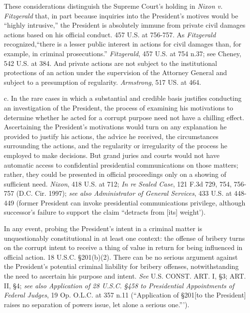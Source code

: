 These considerations distinguish the Supreme Court’s holding in \textit{Nixon v. Fitzgerald} that, in part because inquiries into the President’s motives would be “highly intrusive,” the President is absolutely immune from private civil damages actions based on his official conduct. 457 U.S. at 756-757.
As \textit{Fitzgerald} recognized,“there is a lesser public interest in actions for civil damages than, for example, in criminal prosecutions.”
\textit{Fitzgerald}, 457 U.S. at 754 n.37; see Cheney, 542 U.S. at 384.
And private actions are not subject to the institutional protections of an action under the supervision of the Attorney General and subject to a presumption of regularity.
\textit{Armstrong}, 517 US. at 464.

c. In the rare cases in which a substantial and credible basis justifies conducting an investigation of the President, the process of examining his motivations to determine whether he acted for a corrupt purpose need not have a chilling effect.
Ascertaining the President’s motivations would turn on any explanation he provided to justify his actions, the advice he received, the circumstances surrounding the actions, and the regularity or irregularity of the process he employed to make decisions.
But grand juries and courts would not have automatic access to confidential presidential communications on those matters; rather, they could be presented in official proceedings only on a showing of sufficient need.
\textit{Nixon}, 418 U.S. at 712;
\textit{In re Sealed Case}, 121 F.3d 729, 754, 756-757 (D.C. Cir. 1997);
\textit{see also Administrator of General Services}, 433 U.S. at 448-449 (former President can invoke presidential communications privilege, although successor’s failure to support the claim “detracts from [its] weight’).

In any event, probing the President’s intent in a criminal matter is unquestionably constitutional in at least one context: the offense of bribery turns on the corrupt intent to receive a thing of value in return for being influenced in official action.
18 U.S.C. \S 201(b)(2).
There can be no serious argument against the President’s potential criminal liability for bribery offenses, notwithstanding the need to ascertain his purpose and intent.
\textit{See} U.S. CONST. ART. I, \S 3; ART. II, \S 4;
\textit{see also Application of 28 U.S.C. \S 458 to Presidential Appointments of Federal Judges}, 19 Op. O.L.C. at 357 n.11 (“Application of \S 201[to the President] raises no separation of powers issue, let alone a serious one.”’).

